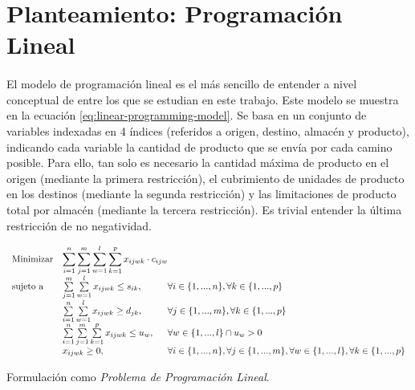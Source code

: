 \documentclass[a4paper, spanish]{article}
\begin{document}
  \section{Planteamiento: Programación Lineal}
  \label{section:linear-programming}

    \paragraph{}
    El modelo de programación lineal es el más sencillo de entender a nivel conceptual de entre los que se estudian en este trabajo. Este modelo se muestra en la ecuación \eqref{eq:linear-programming-model}. Se basa en un conjunto de variables indexadas en 4 índices (referidos a origen, destino, almacén y producto), indicando cada variable la cantidad de producto que se envía por cada camino posible. Para ello, tan solo es necesario la cantidad máxima de producto en el origen (mediante la primera restricción), el cubrimiento de unidades de producto en los destinos (mediante la segunda restricción) y las limitaciones de producto total por almacén (mediante la tercera restricción). Es trivial entender la última restricción de no negatividad.

    \begin{eqfloat}
      \begin{equation}
        \begin{array}{ll@{}ll}
          \text{Minimizar}	& \displaystyle \sum\limits_{i=1}^{n}\sum\limits_{j=1}^{m}\sum\limits_{w=1}^{l}\sum\limits_{k=1}^{p} x_{ijwk} \cdot c_{ijw} \\
          \text{sujeto a}		& \sum\limits_{j=1}^{m}\sum\limits_{w=1}^{l} x_{ijwk}	\leq s_{ik}, 		& \forall i \in \{1,...,n\}, \forall k \in \{1,...,p\}\\
                            &	\sum\limits_{i=1}^{n}\sum\limits_{w=1}^{l} x_{ijwk}	\geq d_{jk}, 		& \forall j \in \{1,...,m\}, \forall k \in \{1,...,p\}\\
                            &	\sum\limits_{i=1}^{n}\sum\limits_{j=1}^{m}\sum\limits_{k=1}^{p} x_{ijwk}	\leq u_{w}, 		& \forall w \in \{1,...,l\}  \cap u_{w} > 0 \\
                            & x_{ijwk}	\geq 0, 	& \forall i \in \{1,...,n\}, \forall j \in \{1,...,m\}, \forall w \in \{1,...,l\}, \forall k \in \{1,...,p\}
        \end{array}
      \end{equation}
      \caption{Formulación como \emph{Problema de Programación Lineal}.}
      \label{eq:linear-programming-model}
    \end{eqfloat}
\end{document}
